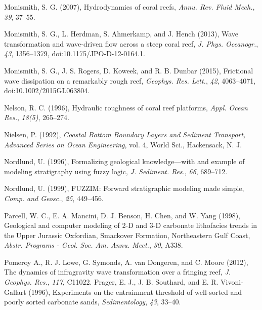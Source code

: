 \documentclass[default,jgrga]{agutex2015}
\begin{document}
\begin{article}
\begin{thebibliography}{}
Monismith, S. G. (2007), Hydrodynamics of coral reefs, \textit{Annu. Rev. Fluid Mech.}, \textit{39}, 37--55.

Monismith, S. G., L. Herdman, S. Ahmerkamp, and J. Hench (2013), Wave transformation and wave-driven flow across a steep coral reef, \textit{J. Phys. Oceanogr.}, \textit{43}, 1356--1379, doi:10.1175/JPO-D-12-0164.1.

Monismith, S. G., J. S. Rogers, D. Koweek, and R. B. Dunbar (2015), Frictional wave dissipation on a remarkably rough reef, \textit{Geophys. Res. Lett.}, \textit{42}, 4063--4071, doi:10.1002/2015GL063804.

Nelson, R. C. (1996), Hydraulic roughness of coral reef platforms, \textit{Appl. Ocean Res.}, \textit{18(5)}, 265--274.

Nielsen, P. (1992), \textit{Coastal Bottom Boundary Layers and Sediment Transport, Advanced Series on Ocean Engineering}, vol. 4, World Sci., Hackensack, N. J.

Nordlund, U. (1996), Formalizing geological knowledge—with and example of modeling stratigraphy using fuzzy logic, \textit{J. Sediment. Res.}, \textit{66}, 689--712.

Nordlund, U. (1999), FUZZIM: Forward stratigraphic modeling made simple, \textit{Comp. and Geosc.}, \textit{25}, 449--456.

Parcell, W. C., E. A. Mancini, D. J. Benson, H. Chen, and W. Yang (1998), Geological and computer modeling of 2-D and 3-D carbonate lithofacies trends in the Upper Jurassic Oxfordian, Smackover Formation, Northeastern Gulf Coast, \textit{Abstr. Programs - Geol. Soc. Am. Annu. Meet.}, \textit{30}, A338.

Pomeroy A., R. J. Lowe, G. Symonds, A. van Dongeren,  and C. Moore (2012), The dynamics of infragravity wave transformation over a fringing reef, \textit{J. Geophys. Res.}, \textit{117}, C11022.
Prager, E. J., J. B. Southard, and E. R. Vivoni-Gallart (1996), Experiments on the entrainment threshold of well-sorted and poorly sorted carbonate sands, \textit{Sedimentology}, \textit{43}, 33--40.


\end{thebibliography}
\end{article}
\end{document}
